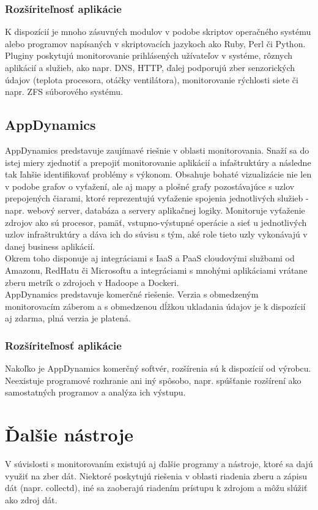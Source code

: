 \documentclass[printed,11pt,twoside,color,cover,table]{fithesis3}
\begin{document}
\subsubsection{Rozšíriteľnosť aplikácie}
K dispozícií je mnoho zásuvných modulov v podobe skriptov operačného systému alebo programov napísaných v skriptovacích jazykoch ako Ruby,
Perl či Python. Pluginy poskytujú monitorovanie prihlásených užívateľov v systéme, rôznych aplikácií a služieb, ako napr. DNS, HTTP, ďalej
podporujú zber senzorických údajov (teplota procesora, otáčky ventilátora), monitorovanie rýchlosti siete či napr. ZFS súborového systému.\cite{ganglia-hadoop}

\subsection{AppDynamics}
AppDynamics predstavuje zaujímavé riešnie v oblasti monitorovania. Snaží sa do istej miery zjednotiť a prepojiť monitorovanie aplikácií 
a infaštruktúry a následne tak ľahšie identifikovať problémy s výkonom. Obsahuje bohaté vizualizácie nie len v podobe grafov o vyťažení,
ale aj mapy a plošné grafy pozostávajúce s uzlov prepojených čiarami, ktoré reprezentujú vyťaženie spojenia jednotlivých služieb - 
napr. webový server, databáza a servery aplikačnej logiky. Monitoruje vyťaženie zdrojov ako sú procesor, pamäť, vstupno-výstupné operácie
a sieť u jednotlivých uzlov infraštruktúry a dáva ich do súvisu s tým, aké role tieto uzly vykonávajú v danej business aplikácií.
\\Okrem toho disponuje aj integráciami s IaaS a PaaS cloudovými službami od Amazonu, RedHatu či Microsoftu a integráciami s mnohými aplikáciami
vrátane zberu metrík o zdrojoch v Hadoope a Dockeri.\cite{appdyn}
\\AppDynamics predstavuje komerčné riešenie. Verzia s obmedzeným monitorovacím záberom a s obmedzenou dĺžkou ukladania údajov je k 
dispozícií aj zdarma, plná verzia je platená.

\subsubsection{Rozšíriteľnosť aplikácie}
Nakoľko je AppDynamics komerčný softvér, rozšírenia sú k dispozícií od výrobcu. Neexistuje programové rozhranie ani iný spôsobo, napr. spúšťanie rozšírení ako samostatných programov a analýza 
ich výstupu.

\section{Ďalšie nástroje}
V súvislosti s monitorovaním existujú aj ďalšie programy a nástroje, ktoré sa dajú využiť na zber dát. Niektoré poskytujú riešenia v oblasti riadenia zberu a zápisu dát (napr. collectd), iné
sa zaoberajú riadením prístupu k zdrojom a môžu slúžiť ako zdroj dát.
\end{document}
